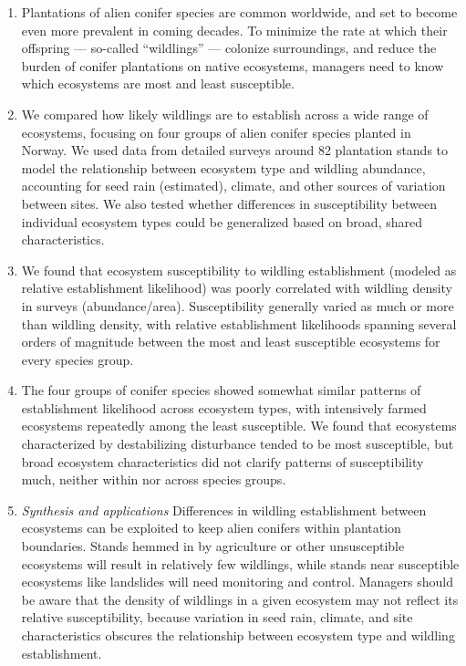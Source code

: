 \documentclass[
]{article}
\providecommand{\tightlist}{%
  \setlength{\itemsep}{0pt}\setlength{\parskip}{0pt}}
\begin{document}
\begin{enumerate}
\def\labelenumi{\arabic{enumi}.}
\tightlist
\item
  Plantations of alien conifer species are common worldwide, and set to become even more prevalent in coming decades. To minimize the rate at which their offspring --- so-called ``wildlings'' --- colonize surroundings, and reduce the burden of conifer plantations on native ecosystems, managers need to know which ecosystems are most and least susceptible.
\item
  We compared how likely wildlings are to establish across a wide range of ecosystems, focusing on four groups of alien conifer species planted in Norway. We used data from detailed surveys around 82 plantation stands to model the relationship between ecosystem type and wildling abundance, accounting for seed rain (estimated), climate, and other sources of variation between sites. We also tested whether differences in susceptibility between individual ecosystem types could be generalized based on broad, shared characteristics.
\item
  We found that ecosystem susceptibility to wildling establishment (modeled as relative establishment likelihood) was poorly correlated with wildling density in surveys (abundance/area). Susceptibility generally varied as much or more than wildling density, with relative establishment likelihoods spanning several orders of magnitude between the most and least susceptible ecosystems for every species group.
\item
  The four groups of conifer species showed somewhat similar patterns of establishment likelihood across ecosystem types, with intensively farmed ecosystems repeatedly among the least susceptible. We found that ecosystems characterized by destabilizing disturbance tended to be most susceptible, but broad ecosystem characteristics did not clarify patterns of susceptibility much, neither within nor across species groups.
\item
  \emph{Synthesis and applications} Differences in wildling establishment between ecosystems can be exploited to keep alien conifers within plantation boundaries. Stands hemmed in by agriculture or other unsusceptible ecosystems will result in relatively few wildlings, while stands near susceptible ecosystems like landslides will need monitoring and control. Managers should be aware that the density of wildlings in a given ecosystem may not reflect its relative susceptibility, because variation in seed rain, climate, and site characteristics obscures the relationship between ecosystem type and wildling establishment.
\end{enumerate}
\end{document}
